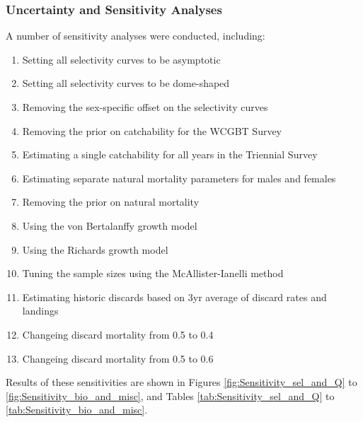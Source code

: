 \documentclass[12pt,]{article}
\begin{document}
\hypertarget{uncertainty-and-sensitivity-analyses}{%
\subsubsection{Uncertainty and Sensitivity
Analyses}\label{uncertainty-and-sensitivity-analyses}}

A number of sensitivity analyses were conducted, including:

\begin{enumerate}

  \item Setting all selectivity curves to be asymptotic
  
  \item Setting all selectivity curves to be dome-shaped

  \item Removing the sex-specific offset on the selectivity curves
  
  \item Removing the prior on catchability for the WCGBT Survey
  
  \item Estimating a single catchability for all years in the Triennial Survey
  
  \item Estimating separate natural mortality parameters for males and females
  
  \item Removing the prior on natural mortality
  
  \item Using the von Bertalanffy growth model

  \item Using the Richards growth model

  \item Tuning the sample sizes using the McAllister-Ianelli method
  
  \item Estimating historic discards based on 3yr average of discard rates and landings
  
  \item Changeing discard mortality from 0.5 to 0.4
  
  \item Changeing discard mortality from 0.5 to 0.6
  
\end{enumerate}

Results of these sensitivities are shown in Figures
\ref{fig:Sensitivity_sel_and_Q} to \ref{fig:Sensitivity_bio_and_misc},
and Tables \ref{tab:Sensitivity_sel_and_Q} to
\ref{tab:Sensitivity_bio_and_misc}.
\end{document}
